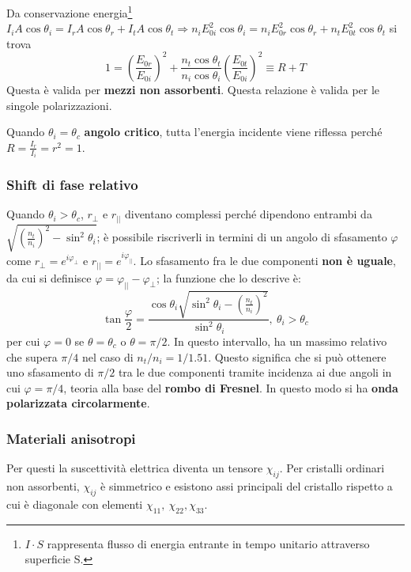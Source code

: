 \documentclass[a4paper]{scrartcl}
\numberwithin{equation}{subsection}
\theoremstyle{style1}
\begin{document}
Da conservazione energia\footnote{$I\cdot S$ rappresenta flusso di energia entrante in tempo unitario attraverso superficie S.} $I_i A\cos\theta _i = I_r A\cos\theta _r + I_t A \cos\theta _t\Rightarrow n_i E_{0i}^2 \cos\theta _i = n_i E_{0r} ^2 \cos\theta _r+ n_t E_{0t}^2 \cos\theta _t  $ si trova
\begin{equation}
	1 = \left(\frac{E_{0r} }{E_{0i}}\right) ^2 + \frac{n_t \cos\theta _t}{n_i \cos\theta _i}\left(\frac{E_{0t}}{E_{0i} }\right) ^2 \equiv R +T
\end{equation}
Questa \`e valida per \textbf{mezzi non assorbenti}. Questa relazione \`e valida per le singole polarizzazioni. 

Quando $\theta _i = \theta _c$ \textbf{angolo critico}, tutta l'energia incidente viene riflessa perch\'e $R = \frac{I_r}{I_i}=r^2 = 1$.

\subsubsection{Shift di fase relativo}
Quando $\theta _i > \theta _c$, $r_\perp$ e $r_{| |} $ diventano complessi perch\'e dipendono entrambi da $\sqrt{\left(\frac{n_t}{n_i}\right) ^2 - \sin^2 \theta _i} $; \`e possibile riscriverli in termini di un angolo di sfasamento $\varphi $ come $r_\perp = e^{i \varphi _\perp} $ e $r_{| |}=e^{i\varphi _{| |} }  $. Lo sfasamento fra le due componenti \textbf{non \`e uguale}, da cui si definisce $\varphi = \varphi _{| |} - \varphi _\perp  $; la funzione che lo descrive \`e:
\begin{equation}
	\tan \frac{\varphi }{2}= \frac{\cos \theta _i \sqrt{\sin^2 \theta _i - \left(\frac{n_t}{n_i}\right) ^2} }{\sin^2 \theta _i}, \ \theta _i > \theta _c
\end{equation}
per cui $\varphi =0$ se $\theta =\theta _c$ o $\theta = \pi / 2$. In questo intervallo, ha un massimo relativo che supera $\pi / 4$ nel caso di $n_t / n_i = 1 / 1.51$. Questo significa che si pu\`o ottenere uno sfasamento di $\pi / 2$ tra le due componenti tramite incidenza ai due angoli in cui $\varphi = \pi / 4$, teoria alla base del \textbf{rombo di Fresnel}. In questo modo si ha \textbf{onda polarizzata circolarmente}.
\subsubsection{Materiali anisotropi}

Per questi la suscettivit\`a elettrica diventa un tensore $\chi _{ij} $. Per cristalli ordinari non assorbenti, $\chi _{ij} $ \`e simmetrico e esistono assi principali del cristallo rispetto a cui \`e diagonale con elementi $\chi_{11}, \ \chi _{22} , \chi _{33} $.
\end{document}
